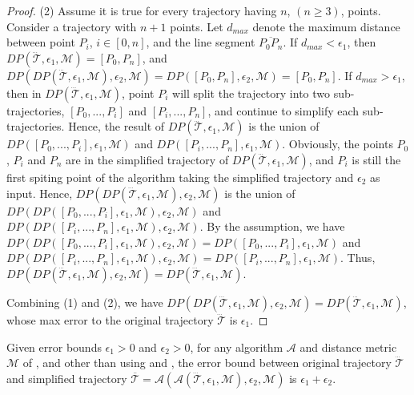 \begin{proof}
	(2) Assume it is true for every trajectory  having $n$, $(n \ge 3)$, points.
	Consider a trajectory with $n+1$ points. Let $d_{max}$ denote the maximum distance between point $P_i$, $i \in [0,n]$, and the line segment $\overline{P_0P_{n}}$.
	If $d_{max}<\epsilon_1$, then $DP(\dddot{\mathcal{T}}, \epsilon_1, \mathcal{M})=[P_0, P_{n}]$, and $DP(DP(\dddot{\mathcal{T}}, \epsilon_1, \mathcal{M}), \epsilon_2, \mathcal{M}) = DP([P_0, P_{n}], \epsilon_2, \mathcal{M})=[P_0, P_{n}]$.
	If $d_{max} > \epsilon_1$, then in $DP(\dddot{\mathcal{T}}, \epsilon_1, \mathcal{M})$, point $P_i$ will split the trajectory  into two sub-trajectories, \ie $[P_0, ..., P_i]$ and $[P_{i}, ..., P_{n}]$, and continue to simplify each sub-trajectories. Hence, the result of $DP(\dddot{\mathcal{T}}, \epsilon_1, \mathcal{M})$ is the union of $DP([P_0, ..., P_i], \epsilon_1, \mathcal{M})$ and $DP([P_i, ..., P_n], \epsilon_1, \mathcal{M})$.
	Obviously, the points $P_0$, $P_i$ and $P_n$ are in the simplified trajectory of $DP(\dddot{\mathcal{T}}, \epsilon_1, \mathcal{M})$, and $P_i$ is still the first spiting point of the \dpa algorithm taking the simplified trajectory and $\epsilon_2$ as input. Hence, $DP(DP(\dddot{\mathcal{T}}, \epsilon_1, \mathcal{M}), \epsilon_2, \mathcal{M})$ is the union of $DP(DP([P_0, ..., P_i], \epsilon_1, \mathcal{M}), \epsilon_2, \mathcal{M})$ and $DP(DP([P_i, ..., P_n], \epsilon_1, \mathcal{M}), \epsilon_2, \mathcal{M})$. By the assumption, we have $DP(DP([P_0, ..., P_i], \epsilon_1, \mathcal{M}), \epsilon_2, \mathcal{M}) = DP([P_0, ..., P_i], \epsilon_1, \mathcal{M})$ and $DP(DP([P_i, ..., P_n], \epsilon_1, \mathcal{M}), \epsilon_2, \mathcal{M}) = DP([P_i, ..., P_n], \epsilon_1, \mathcal{M})$. Thus, $DP(DP(\dddot{\mathcal{T}}, \epsilon_1, \mathcal{M}), \epsilon_2, \mathcal{M}) = DP(\dddot{\mathcal{T}}, \epsilon_1, \mathcal{M})$.
	
	Combining (1) and (2), we have $DP(DP(\dddot{\mathcal{T}}, \epsilon_1, \mathcal{M}), \epsilon_2, \mathcal{M}) = DP(\dddot{\mathcal{T}}, \epsilon_1, \mathcal{M})$, whose max error to the original trajectory $\dddot{\mathcal{T}}$ is $\epsilon_1$.
\end{proof}


\begin{proposition}
	\label{theo-aging-distance}
	Given error bounds $\epsilon_1>0$ and $\epsilon_2>0$, for any \lsa algorithm $\mathcal{A}$ and distance metric $\mathcal{M}$ of \ped, \sed and \dad other than \dpa using \ped and \sed, the error bound between original trajectory $\dddot{\mathcal{T}}$ and simplified trajectory $\overline{\mathcal{T}}=\mathcal{A}(\mathcal{A}(\dddot{\mathcal{T}}, \epsilon_1, \mathcal{M}), \epsilon_2, \mathcal{M})$ is $\epsilon_1+ \epsilon_2$.
\end{proposition}

